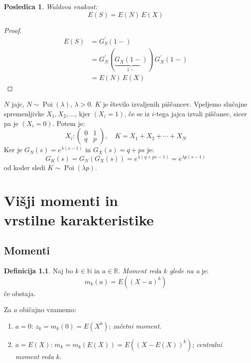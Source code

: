 \documentclass[12pt]{book}
\def\n{\noindent}
\theoremstyle{definition}
\newtheorem{definicija}{Definicija}
\theoremstyle{plain}
\theoremstyle{plain}
\theoremstyle{plain}
\newtheorem{posledica}{Posledica}
\theoremstyle{remark}
\begin{document}
\begin{posledica}
    Waldova enakost: 
    $$
    E(S)=E(N) \, E(X)
    $$
\end{posledica}

\begin{proof}
    \begin{align*}
        E(S)&=G_S^{\prime}(1-) \\
        &=G_N^{\prime}(\underbrace{G_X(1-)}_{1-}) \, G_X^{\prime}(1-) \\
        &=E(N) \, E(X)
    \end{align*}
\end{proof}

\begin{zgled}
    $N$ jajc, $N \sim \operatorname{Poi}(\lambda)$, $\lambda > 0$. $K$ je število izvaljenih piščancev. Vpeljemo slučajne spremenljivke $X_1, X_2, \ldots$, kjer $(X_i=1)$, če se iz $i$-tega jajca izvali piščanec, sicer pa je $(X_i=0)$. Potem je: 
    $$
    X_i:\left(\begin{array}{cc}
        0 & 1 \\
        q & p
        \end{array}\right), \quad K = X_1 + X_2 + \cdots + X_N
    $$
    Ker je $G_N(s)=e^{\lambda (s-1)}$ in $G_X(s)=q+p  s$ je: 
    $$
    G_K(s)=G_N\left(G_X(s)\right)=e^{\lambda(q+p s-1)}=e^{\lambda p(s-1)}
    $$
    od koder sledi $K \sim \operatorname{Poi}(\lambda p)$.
\end{zgled}

\chapter[Višji momenti in vrstilne karakteristike]{Višji momenti in\\vrstilne karakteristike}

\section{Momenti}

\begin{definicija}
    Naj bo $k \in \mathbb{N}$ in $a \in \mathbb{R}$. \emph{Moment reda $k$ glede na a} je:
    $$
    m_k(a)=E\left((X-a)^k\right)
    $$
    če obstaja.     
\end{definicija}

\n Za $a$ običajno vzamemo: 
\begin{enumerate}
    \item $a=0$: $z_k=m_k(0)=E\left(X^k\right)$; \emph{začetni moment}. 
    \item $a=E(X)$: $m_k=m_k(E(X))=E\left((X-E(X))^k\right)$; \emph{centralni moment reda $k$}.
\end{enumerate}
\end{document}
